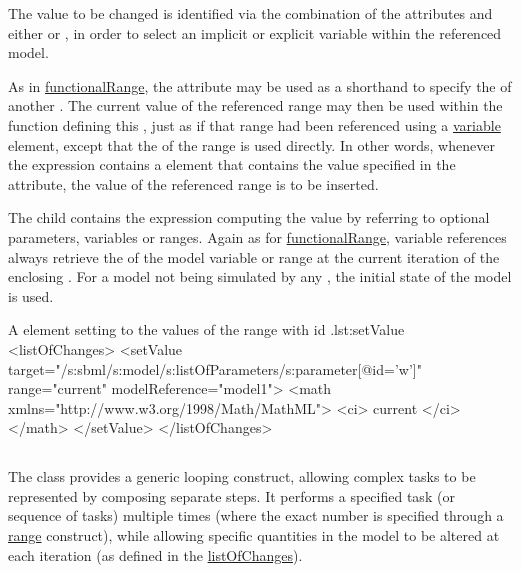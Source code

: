 The value to be changed is identified via the combination of the attributes  and either  or , in order to select an implicit or explicit variable within the referenced model.

As in \hyperref[class:functionalRange]{functionalRange}, the attribute  may be used as a shorthand to specify the  of another . The current value of the referenced range may then be used within the function defining this , just as if that range had been referenced using a \hyperref[class:variable]{variable} element, except that the  of the range is used directly. In other words, whenever the expression contains a  element that contains the value specified in the  attribute, the value of the referenced range is to be inserted.

The child  contains the expression computing the value by referring to optional parameters, variables or ranges.
Again as for \hyperref[class:functionalRange]{functionalRange}, variable references always retrieve the  of the model variable or range at the current iteration of the enclosing . For a model not being simulated by any , the initial state of the model is used.

\begin{myXmlLst}{A  element setting  to the values of the range with id .}{lst:setValue}
  <listOfChanges>
    <setValue target="/s:sbml/s:model/s:listOfParameters/s:parameter[@id='w']"
              range="current" modelReference="model1">
      <math xmlns="http://www.w3.org/1998/Math/MathML">
        <ci> current </ci>
      </math>
    </setValue>
  </listOfChanges>
\end{myXmlLst}


\subsection{}
\label{class:repeatedTask}

The  class provides a generic looping construct, allowing complex tasks to be represented by composing separate steps. It performs a specified task (or sequence of tasks) multiple times (where the exact number is specified through a \hyperref[sec:ranges]{range} construct), while allowing specific quantities in the model to be altered at each iteration (as defined in the \hyperref[sec:changes]{listOfChanges}).

